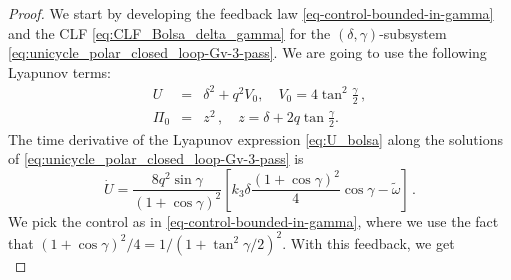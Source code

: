 \documentclass[letterpaper, 10 pt, conference]{ieeeconf}  %
\begin{document}
\begin{proof}
We start by developing the feedback law \eqref{eq-control-bounded-in-gamma} and the CLF \eqref{eq:CLF_Bolsa_delta_gamma} for the $(\delta, \gamma)$-subsystem   \eqref{eq:unicycle_polar_closed_loop-Gv-3-pass}. 
We are going to use the following Lyapunov terms:
\begin{eqnarray}
U &=& \delta^2 +   q^2 V_0, \quad V_0 = 4 \tan^2\frac{\gamma}{2}\,,  \label{eq:U_bolsa} \\
\Pi_0 &=& z^2\,, \quad z = \delta + 2 q \tan\frac{\gamma}{2}.
\end{eqnarray}
The time derivative of the Lyapunov expression \eqref{eq:U_bolsa} along the solutions of \eqref{eq:unicycle_polar_closed_loop-Gv-3-pass} is
\begin{equation}
\dot U  =  \frac{8 q^2 \sin\gamma}{(1+\cos\gamma)^2} \left[ k_3 \delta \frac{(1+\cos\gamma)^2}{4} \cos\gamma 
- \tilde{\omega}\right]\,.
\end{equation}
We pick the control as in \eqref{eq-control-bounded-in-gamma}, where we use the fact that $(1+\cos\gamma)^2/4 = 1/(1+\tan^2 \gamma/2)^2$. With this feedback, we get
\begin{equation}

\end{equation}
\end{proof}
\end{document}
